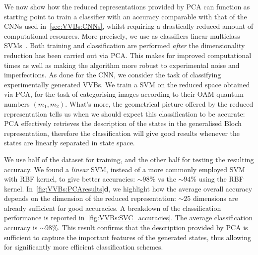 We now show how the reduced representations provided by \ac{PCA} can function as starting point to train a classifier with an accuracy comparable with that of the \acp{CNN} used in~\cref{sec:VVBs:CNNs}, whilst requiring a drastically reduced amount of computational resources.
More precisely, we use as classifiers linear multiclass \acp{SVM}~\cite{hearst1998support,shawe2000support}.
Both training and classification are performed \emph{after} the dimensionality reduction has been carried out via \ac{PCA}. This makes for improved computational times as well as making the algorithm more robust to experimental noise and imperfections.
As done for the \ac{CNN}, we consider the task of classifying experimentally generated VVBs. We train a \ac{SVM} on the reduced space obtained via \ac{PCA}, for the task of categorising images according to their OAM quantum numbers $(m_1,m_2)$.
What's more, the geometrical picture offered by the reduced representation tells us when we should expect this classification to be accurate: \ac{PCA} effectively retrieves the description of the states in the generalised Bloch representation, therefore the classification will give good results whenever the states are linearly separated in state space.

We use half of the dataset for training, and the other half for testing the resulting accuracy.
We found a \emph{linear} SVM, instead of a more commonly employed SVM with RBF kernel, to give better accuracies: $\sim98\%$ vs the $\sim94\%$ using the RBF kernel.
In~\cref{fig:VVBs:PCAresults}\textbf{d}, we highlight how the average overall accuracy depends on the dimension of the reduced representation: $\sim 25$ dimensions are already sufficient for good accuracies.
A breakdown of the classification performance is reported in~\cref{fig:VVBs:SVC_accuracies}.
The average classification accuracy is $\sim 98 \%$. This result confirms that the description provided by \ac{PCA} is sufficient to capture the important features of the generated states, thus allowing for significantly more efficient classification schemes.

